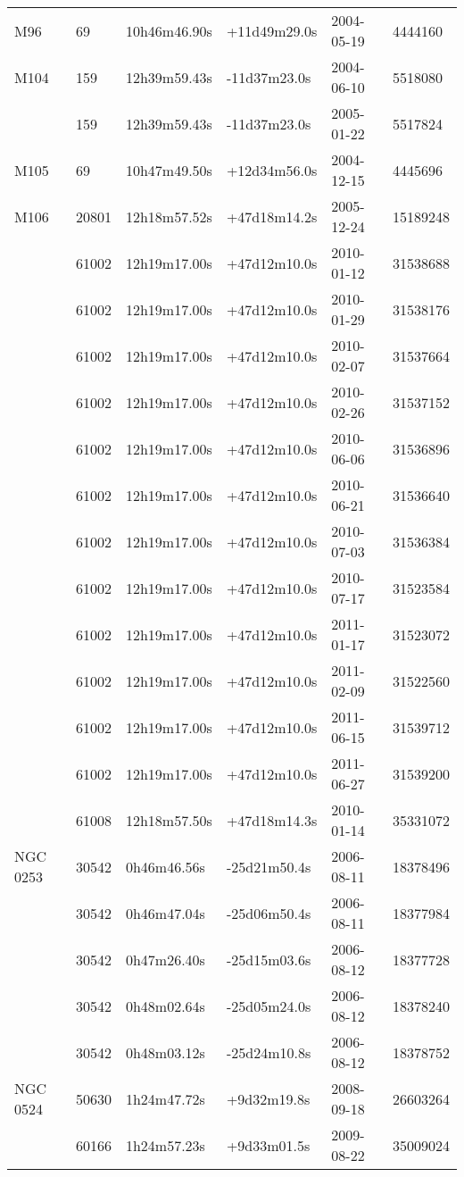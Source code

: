 \begin{table*}
\begin{center}
\begin{tabular}{llllll}
  M96 & 69 & 10h46m46.90s & +11d49m29.0s & 2004-05-19 & 4444160\\
  M104 & 159 & 12h39m59.43s & -11d37m23.0s & 2004-06-10 & 5518080\\
   & 159 & 12h39m59.43s & -11d37m23.0s & 2005-01-22 & 5517824\\
  M105 & 69 & 10h47m49.50s & +12d34m56.0s & 2004-12-15 & 4445696\\
  M106 & 20801 & 12h18m57.52s & +47d18m14.2s & 2005-12-24 & 15189248\\
   & 61002 & 12h19m17.00s & +47d12m10.0s & 2010-01-12 & 31538688\\
   & 61002 & 12h19m17.00s & +47d12m10.0s & 2010-01-29 & 31538176\\
   & 61002 & 12h19m17.00s & +47d12m10.0s & 2010-02-07 & 31537664\\
   & 61002 & 12h19m17.00s & +47d12m10.0s & 2010-02-26 & 31537152\\
   & 61002 & 12h19m17.00s & +47d12m10.0s & 2010-06-06 & 31536896\\
   & 61002 & 12h19m17.00s & +47d12m10.0s & 2010-06-21 & 31536640\\
   & 61002 & 12h19m17.00s & +47d12m10.0s & 2010-07-03 & 31536384\\
   & 61002 & 12h19m17.00s & +47d12m10.0s & 2010-07-17 & 31523584\\
   & 61002 & 12h19m17.00s & +47d12m10.0s & 2011-01-17 & 31523072\\
   & 61002 & 12h19m17.00s & +47d12m10.0s & 2011-02-09 & 31522560\\
   & 61002 & 12h19m17.00s & +47d12m10.0s & 2011-06-15 & 31539712\\
   & 61002 & 12h19m17.00s & +47d12m10.0s & 2011-06-27 & 31539200\\
   & 61008 & 12h18m57.50s & +47d18m14.3s & 2010-01-14 & 35331072\\
  NGC 0253 & 30542 & 0h46m46.56s & -25d21m50.4s & 2006-08-11 & 18378496\\
   & 30542 & 0h46m47.04s & -25d06m50.4s & 2006-08-11 & 18377984\\
   & 30542 & 0h47m26.40s & -25d15m03.6s & 2006-08-12 & 18377728\\
   & 30542 & 0h48m02.64s & -25d05m24.0s & 2006-08-12 & 18378240\\
   & 30542 & 0h48m03.12s & -25d24m10.8s & 2006-08-12 & 18378752\\
  NGC 0524 & 50630 & 1h24m47.72s & +9d32m19.8s & 2008-09-18 & 26603264\\
   & 60166 & 1h24m57.23s & +9d33m01.5s & 2009-08-22 & 35009024\\

\end{tabular}
\end{center}
\end{table*}

